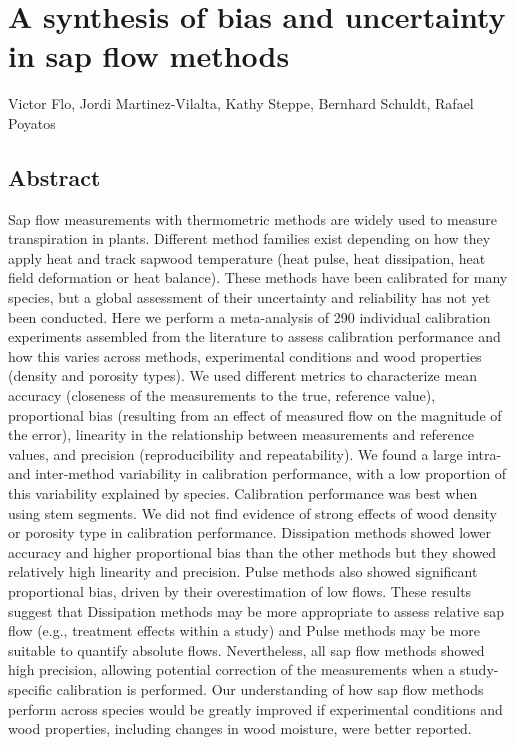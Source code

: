 \documentclass[11pt,twoside]{reedthesis}
\begin{document}
\chapter[Bias and uncertainty in sap flow methods]{A synthesis of bias and uncertainty in sap flow methods}

\setlength{\parindent}{0pt} Victor Flo, Jordi Martinez-Vilalta, Kathy
Steppe, Bernhard Schuldt, Rafael Poyatos \newpage
\setlength{\parindent}{30pt}

\section*{Abstract}

Sap flow measurements with thermometric methods are widely used to
measure transpiration in plants. Different method families exist
depending on how they apply heat and track sapwood temperature (heat
pulse, heat dissipation, heat field deformation or heat balance). These
methods have been calibrated for many species, but a global assessment
of their uncertainty and reliability has not yet been conducted. Here we
perform a meta-analysis of 290 individual calibration experiments
assembled from the literature to assess calibration performance and how
this varies across methods, experimental conditions and wood properties
(density and porosity types). We used different metrics to characterize
mean accuracy (closeness of the measurements to the true, reference
value), proportional bias (resulting from an effect of measured flow on
the magnitude of the error), linearity in the relationship between
measurements and reference values, and precision (reproducibility and
repeatability). We found a large intra- and inter-method variability in
calibration performance, with a low proportion of this variability
explained by species. Calibration performance was best when using stem
segments. We did not find evidence of strong effects of wood density or
porosity type in calibration performance. Dissipation methods showed
lower accuracy and higher proportional bias than the other methods but
they showed relatively high linearity and precision. Pulse methods also
showed significant proportional bias, driven by their overestimation of
low flows. These results suggest that Dissipation methods may be more
appropriate to assess relative sap flow (e.g., treatment effects within
a study) and Pulse methods may be more suitable to quantify absolute
flows. Nevertheless, all sap flow methods showed high precision,
allowing potential correction of the measurements when a study-specific
calibration is performed. Our understanding of how sap flow methods
perform across species would be greatly improved if experimental
conditions and wood properties, including changes in wood moisture, were
better reported.\par
\end{document}
